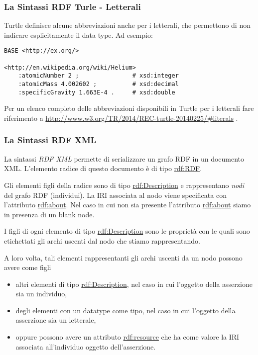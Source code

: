 \documentclass[8pt]{beamer}
\begin{document}
\begin{frame}[fragile]
 \frametitle{La Sintassi RDF Turle - Letterali}

Turtle definisce alcune abbreviazioni anche per i letterali,
che permettono di non indicare esplicitamente il data type.
Ad esempio:

\begin{Verbatim}[fontsize=\small]
BASE <http://ex.org/>

<http://en.wikipedia.org/wiki/Helium>                                                                                  
    :atomicNumber 2 ;               # xsd:integer                                                                      
    :atomicMass 4.002602 ;          # xsd:decimal                                                                      
    :specificGravity 1.663E-4 .     # xsd:double   
\end{Verbatim}
\vspace{\baselineskip}

Per un elenco completo delle abbreviazioni disponibili in Turtle per i
letterali fare riferimento a \url{http://www.w3.org/TR/2014/REC-turtle-20140225/\#literals} .
\end{frame}

\begin{frame}
 \frametitle{La Sintassi RDF XML}
 La sintassi \emph{RDF XML} permette di serializzare un grafo RDF 
 in un documento XML. L'elemento radice di questo documento \`e di
 tipo \url{rdf:RDF}.
 \vspace{\baselineskip}
 
 Gli elementi figli della radice sono di tipo \url{rdf:Description}
 e rappresentano \emph{nodi} del grafo RDF (individui). La IRI associata 
 al nodo viene specificata con l'attributo \url{rdf:about}. Nel caso in
 cui non sia presente l'attributo \url{rdf:about} siamo in presenza
 di un blank node.
 \vspace{\baselineskip}

 I figli di ogni elemento di tipo \url{rdf:Description} sono le
 propriet\`a con le quali sono etichettati gli archi uscenti dal 
 nodo che stiamo rappresentando.
 \vspace{\baselineskip}

 A loro volta, tali elementi rappresentanti gli archi uscenti da
 un nodo possono avere come figli 
 \begin{itemize}
  \item altri elementi di tipo \url{rdf:Description}, nel caso in cui
  l'oggetto della asserzione sia un individuo,
  \item degli elementi con un datatype come tipo, nel caso in cui 
  l'oggetto della asserzione sia un letterale,
  \item oppure possono avere un attributo \url{rdf:resource} che ha
  come valore la IRI associata all'individuo oggetto dell'asserzione.
 \end{itemize}
\end{frame}
\end{document}
